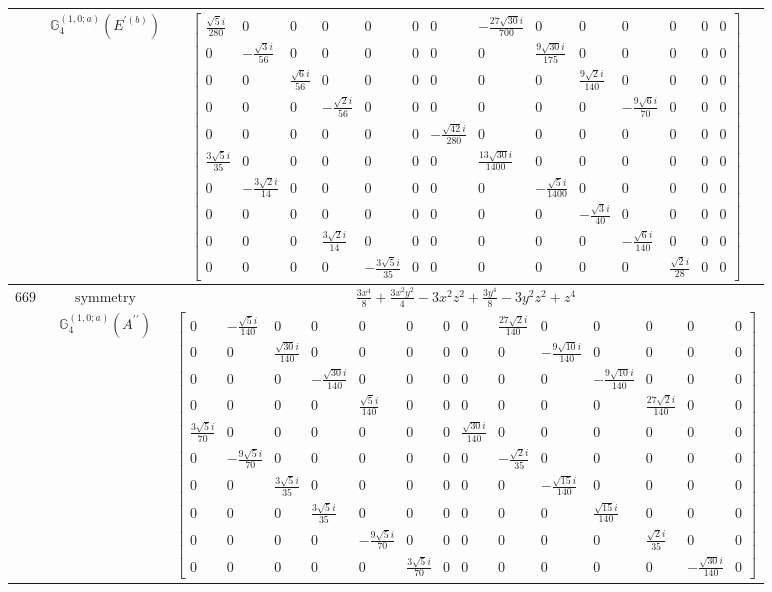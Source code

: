 \documentclass[fleqn,8pt,landscape]{jsarticle}
\begin{document}
\begin{longtable}{ccc}
$  $ & $ \mathbb{G}_{4}^{(1,0;a)}(E^{\prime(b)}) $ & $ \begin{bmatrix} \frac{\sqrt{5} i}{280} & 0 & 0 & 0 & 0 & 0 & 0 & - \frac{27 \sqrt{30} i}{700} & 0 & 0 & 0 & 0 & 0 & 0 \\ 0 & - \frac{\sqrt{3} i}{56} & 0 & 0 & 0 & 0 & 0 & 0 & \frac{9 \sqrt{30} i}{175} & 0 & 0 & 0 & 0 & 0 \\ 0 & 0 & \frac{\sqrt{6} i}{56} & 0 & 0 & 0 & 0 & 0 & 0 & \frac{9 \sqrt{2} i}{140} & 0 & 0 & 0 & 0 \\ 0 & 0 & 0 & - \frac{\sqrt{2} i}{56} & 0 & 0 & 0 & 0 & 0 & 0 & - \frac{9 \sqrt{6} i}{70} & 0 & 0 & 0 \\ 0 & 0 & 0 & 0 & 0 & 0 & - \frac{\sqrt{42} i}{280} & 0 & 0 & 0 & 0 & 0 & 0 & 0 \\ \frac{3 \sqrt{5} i}{35} & 0 & 0 & 0 & 0 & 0 & 0 & \frac{13 \sqrt{30} i}{1400} & 0 & 0 & 0 & 0 & 0 & 0 \\ 0 & - \frac{3 \sqrt{2} i}{14} & 0 & 0 & 0 & 0 & 0 & 0 & - \frac{\sqrt{5} i}{1400} & 0 & 0 & 0 & 0 & 0 \\ 0 & 0 & 0 & 0 & 0 & 0 & 0 & 0 & 0 & - \frac{\sqrt{3} i}{40} & 0 & 0 & 0 & 0 \\ 0 & 0 & 0 & \frac{3 \sqrt{2} i}{14} & 0 & 0 & 0 & 0 & 0 & 0 & - \frac{\sqrt{6} i}{140} & 0 & 0 & 0 \\ 0 & 0 & 0 & 0 & - \frac{3 \sqrt{5} i}{35} & 0 & 0 & 0 & 0 & 0 & 0 & \frac{\sqrt{2} i}{28} & 0 & 0 \end{bmatrix} $ \\ \hline
$ 669 $ & $ \text{symmetry} $ & $ \frac{3 x^{4}}{8} + \frac{3 x^{2} y^{2}}{4} - 3 x^{2} z^{2} + \frac{3 y^{4}}{8} - 3 y^{2} z^{2} + z^{4} $ \\
$  $ & $ \mathbb{G}_{4}^{(1,0;a)}(A^{\prime\prime}) $ & $ \begin{bmatrix} 0 & - \frac{\sqrt{5} i}{140} & 0 & 0 & 0 & 0 & 0 & 0 & \frac{27 \sqrt{2} i}{140} & 0 & 0 & 0 & 0 & 0 \\ 0 & 0 & \frac{\sqrt{30} i}{140} & 0 & 0 & 0 & 0 & 0 & 0 & - \frac{9 \sqrt{10} i}{140} & 0 & 0 & 0 & 0 \\ 0 & 0 & 0 & - \frac{\sqrt{30} i}{140} & 0 & 0 & 0 & 0 & 0 & 0 & - \frac{9 \sqrt{10} i}{140} & 0 & 0 & 0 \\ 0 & 0 & 0 & 0 & \frac{\sqrt{5} i}{140} & 0 & 0 & 0 & 0 & 0 & 0 & \frac{27 \sqrt{2} i}{140} & 0 & 0 \\ \frac{3 \sqrt{5} i}{70} & 0 & 0 & 0 & 0 & 0 & 0 & \frac{\sqrt{30} i}{140} & 0 & 0 & 0 & 0 & 0 & 0 \\ 0 & - \frac{9 \sqrt{5} i}{70} & 0 & 0 & 0 & 0 & 0 & 0 & - \frac{\sqrt{2} i}{35} & 0 & 0 & 0 & 0 & 0 \\ 0 & 0 & \frac{3 \sqrt{5} i}{35} & 0 & 0 & 0 & 0 & 0 & 0 & - \frac{\sqrt{15} i}{140} & 0 & 0 & 0 & 0 \\ 0 & 0 & 0 & \frac{3 \sqrt{5} i}{35} & 0 & 0 & 0 & 0 & 0 & 0 & \frac{\sqrt{15} i}{140} & 0 & 0 & 0 \\ 0 & 0 & 0 & 0 & - \frac{9 \sqrt{5} i}{70} & 0 & 0 & 0 & 0 & 0 & 0 & \frac{\sqrt{2} i}{35} & 0 & 0 \\ 0 & 0 & 0 & 0 & 0 & \frac{3 \sqrt{5} i}{70} & 0 & 0 & 0 & 0 & 0 & 0 & - \frac{\sqrt{30} i}{140} & 0 \end{bmatrix} $ \\ \hline

\end{longtable}
\end{document}
